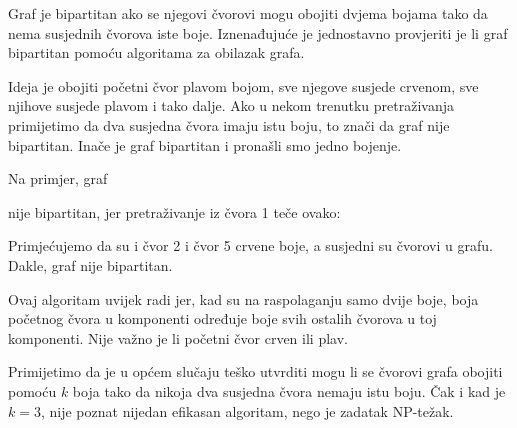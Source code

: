 
Graf je bipartitan ako se njegovi čvorovi mogu obojiti
dvjema bojama tako da nema susjednih
čvorova iste boje.
Iznenađujuće je jednostavno provjeriti je li graf
bipartitan pomoću algoritama za obilazak grafa.

Ideja je obojiti početni čvor plavom bojom,
sve njegove susjede crvenom, sve njihove susjede plavom i tako dalje.
Ako u nekom trenutku pretraživanja primijetimo da
dva susjedna čvora imaju istu boju,
to znači da graf nije bipartitan.
Inače je graf bipartitan i pronašli smo
jedno bojenje.

Na primjer, graf
\begin{center}
\end{center}
nije bipartitan, jer pretraživanje iz čvora 1
teče ovako:
\begin{center}
\end{center}
Primjećujemo da su i čvor 2 i čvor 5
crvene boje, a susjedni su čvorovi u grafu.
Dakle, graf nije bipartitan.

Ovaj algoritam uvijek radi jer, kad
su na raspolaganju samo dvije boje,
boja početnog čvora u komponenti
određuje boje svih ostalih čvorova u toj komponenti.
Nije važno je li
početni čvor crven ili plav.

Primijetimo da je u općem slučaju
teško utvrditi mogu li se čvorovi
grafa obojiti pomoću $k$ boja
tako da nikoja dva susjedna čvora nemaju istu boju.
Čak i kad je $k=3$, nije poznat nijedan efikasan algoritam,
nego je zadatak NP-težak.
